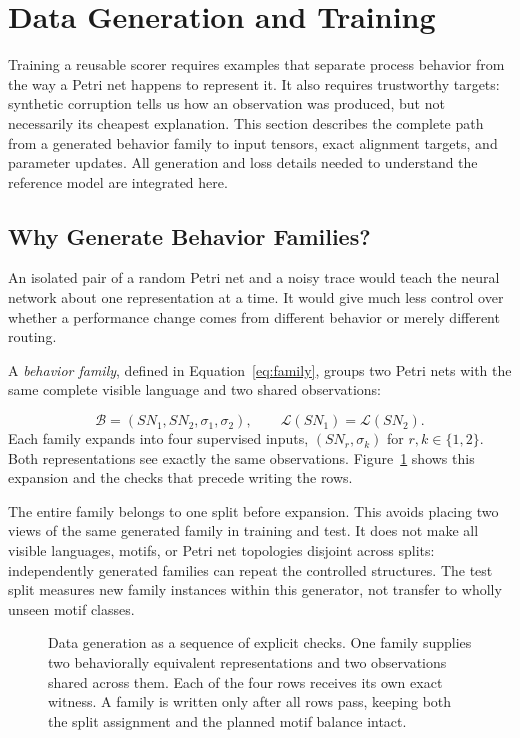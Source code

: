 \section{Data Generation and Training}
\label{sec:training}

Training a reusable scorer requires examples that separate process behavior from the way a Petri net happens to represent it. It also requires trustworthy targets: synthetic corruption tells us how an observation was produced, but not necessarily its cheapest explanation. This section describes the complete path from a generated behavior family to input tensors, exact alignment targets, and parameter updates. All generation and loss details needed to understand the reference model are integrated here.

\subsection{Why Generate Behavior Families?}
\label{sec:families}

An isolated pair of a random Petri net and a noisy trace would teach the neural network about one representation at a time. It would give much less control over whether a performance change comes from different behavior or merely different routing. \begin{revised}A \emph{behavior family}, defined in Equation~\eqref{eq:family}, groups two Petri nets with the same complete visible language and two shared observations:\end{revised}
\begin{equation}
 \mathcal B=(SN_1,SN_2,\sigma_1,\sigma_2),\qquad
 \mathcal L(SN_1)=\mathcal L(SN_2).
 \label{eq:family}
\end{equation}
Each family expands into four supervised inputs, $(SN_r,\sigma_k)$ for $r,k\in\{1,2\}$. Both representations see exactly the same observations. Figure~\ref{fig:family} shows this expansion and the checks that precede writing the rows.

The entire family belongs to one split before expansion. This avoids placing two views of the same generated family in training and test. It does not make all visible languages, motifs, or Petri net topologies disjoint across splits: independently generated families can repeat the controlled structures. The test split measures new family instances within this generator, not transfer to wholly unseen motif classes.

\begin{figure}[!t]
\centering

\caption{Data generation as a sequence of explicit checks. One family supplies two behaviorally equivalent representations and two observations shared across them. Each of the four rows receives its own exact witness. A family is written only after all rows pass, keeping both the split assignment and the planned motif balance intact.}
\label{fig:family}
\end{figure}

